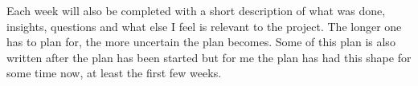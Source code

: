 \documentclass[msc,lith,english]{liuthesis}
\begin{document}
Each week will also be completed with a short description of what was done, insights, questions and what else I feel is relevant to the project. The longer one has to plan for, the more uncertain the plan becomes. Some of this plan is also written after the plan has been started but for me the plan has had this shape for some time now, at least the first few weeks.

\newcommand{\past}[0]{\textbf{Done:}\hspace{0.2em}}
\newcommand{\curr}[0]{\textbf{\MVRightarrow}\hspace{0.2em}}
\newcommand{\futr}[0]{\textbf{Future:}\hspace{0.2em}}
\newcommand{\presentable}[1]{\newline{}\textbf{Presentable:}\hspace{0.2em}#1}
\end{document}
